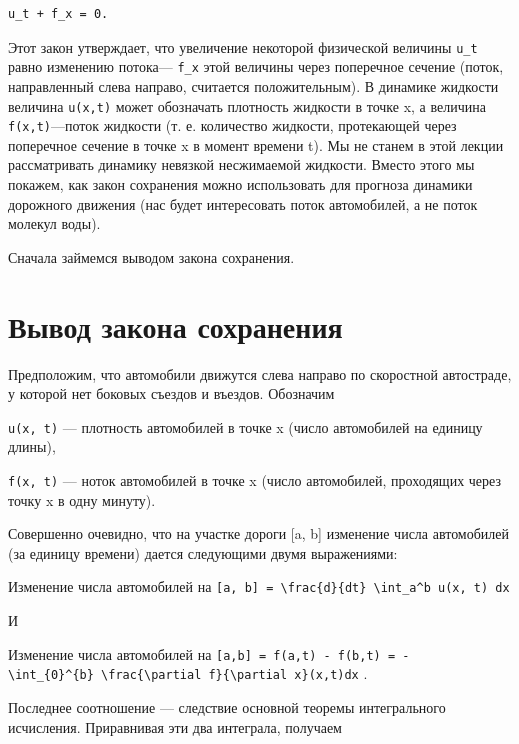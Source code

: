 \documentclass[
  ukrainian,
]{article}
\begin{document}
\begin{verbatim}
u_t + f_x = 0.
\end{verbatim}

Этот закон утверждает, что увеличение некоторой физической величины
\texttt{u\_t} равно изменению потока--- \texttt{f\_x} этой величины
через поперечное сечение (поток, направленный слева направо, считается
положительным). В динамике жидкости величина \texttt{u(x,t)} может
обозначать плотность жидкости в точке x, а величина
\texttt{f(x,t)}---поток жидкости (т. е. количество жидкости, протекающей
через поперечное сечение в точке x в момент времени t). Мы не станем в
этой лекции рассматривать динамику невязкой несжимаемой жидкости. Вместо
этого мы покажем, как закон сохранения можно использовать для прогноза
динамики дорожного движения (нас будет интересовать поток автомобилей, а
не поток молекул воды).

Сначала займемся выводом закона сохранения.

\section{Вывод закона
сохранения}\label{ux432ux44bux432ux43eux434-ux437ux430ux43aux43eux43dux430-ux441ux43eux445ux440ux430ux43dux435ux43dux438ux44f}

Предположим, что автомобили движутся слева направо по скоростной
автостраде, у которой нет боковых съездов и въездов. Обозначим

\texttt{u(x,\ t)} --- плотность автомобилей в точке x (число автомобилей
на единицу длины),

\texttt{f(x,\ t)} --- ноток автомобилей в точке x (число автомобилей,
проходящих через точку x в одну минуту).

Совершенно очевидно, что на участке дороги {[}a, b{]} изменение числа
автомобилей (за единицу времени) дается следующими двумя выражениями:

Изменение числа автомобилей на
\texttt{{[}a,\ b{]}\ =\ \textbackslash{}frac\{d\}\{dt\}\ \textbackslash{}int\_a\^{}b\ u(x,\ t)\ dx}

И

Изменение числа автомобилей на
\texttt{{[}a,b{]}\ =\ f(a,t)\ -\ f(b,t)\ =\ -\textbackslash{}int\_\{0\}\^{}\{b\}\ \textbackslash{}frac\{\textbackslash{}partial\ f\}\{\textbackslash{}partial\ x\}(x,t)dx}
.

Последнее соотношение --- следствие основной теоремы интегрального
исчисления. Приравнивая эти два интеграла, получаем
\end{document}

